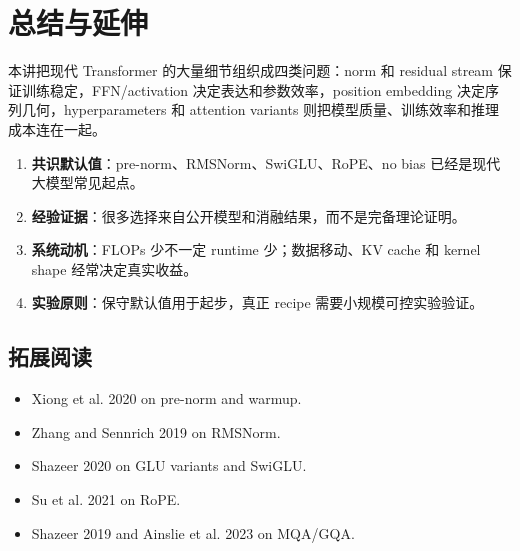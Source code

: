 \section{总结与延伸}
本讲把现代 Transformer 的大量细节组织成四类问题：norm 和 residual stream 保证训练稳定，FFN/activation 决定表达和参数效率，position embedding 决定序列几何，hyperparameters 和 attention variants 则把模型质量、训练效率和推理成本连在一起。
\begin{enumerate}
    \item \textbf{共识默认值}：pre-norm、RMSNorm、SwiGLU、RoPE、no bias 已经是现代大模型常见起点。
    \item \textbf{经验证据}：很多选择来自公开模型和消融结果，而不是完备理论证明。
    \item \textbf{系统动机}：FLOPs 少不一定 runtime 少；数据移动、KV cache 和 kernel shape 经常决定真实收益。
    \item \textbf{实验原则}：保守默认值用于起步，真正 recipe 需要小规模可控实验验证。
\end{enumerate}
\subsection{拓展阅读}
\begin{itemize}
    \item Xiong et al. 2020 on pre-norm and warmup.
    \item Zhang and Sennrich 2019 on RMSNorm.
    \item Shazeer 2020 on GLU variants and SwiGLU.
    \item Su et al. 2021 on RoPE.
    \item Shazeer 2019 and Ainslie et al. 2023 on MQA/GQA.
\end{itemize}

